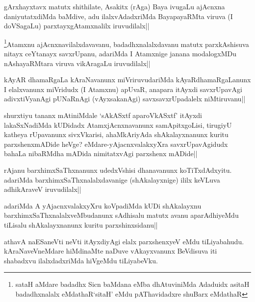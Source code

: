 
\begin{artha}
gArxhayxtavx matutx shithilate, Asakitx (rAga) Baya ivugaLu ajAcnxna daniyutatxdiMda baMdive, adu ilalxvAdadxriMda BayapayaRMta viruva (I doVSagaLu) parxtayxgAtamxnalilx iruvudilalx||
\end{artha}

\begin{artha}
\footnote[1]{sataH aMdare badadhx Sicn baMdana eMba dhAtuviniMda Adaduidx asitaH badadhxnalalx eMdathaR`sitaH' eMdu pAThavidadxre shuBarx eMdathaR}Atamxnu ajAcnxnavilalxdavavanu, badadhxnalalxdavanu matutx parxkAshisuva nitayx ceYtanayx savxrUpanu, adariMda I Atamxnige janana modalogxMDu nAshayaRMtara viruva vikAragaLu iruvudilalx||
\end{artha}

\begin{artha}
kAyAR dhamaRgaLa kAraNavanunx miVriruvudariMda kAyaRdhamaRgaLanunx I elalxvanunx miVridudx (I Atamxnu) apUvaR, anapara itAyxdi savxrUpavAgi adivxtiVyanAgi pUNaRnAgi (vAyxsakanAgi) savxsavxrUpadalelx niMtiruvanu||
\end{artha}

\stext 

\begin{artha}%
shurxtiyu tananx mAtiniMdale `sAkASxtf aparoVkASxtf' itAyxdi lakaSxNadiMda kUDidadx AtamxjAcnxnavanunx samApitxgoLisi, tirugiyU katheya rUpavanunx sivxVkarisi, ahaMkAriyAda shAkalayxnanunx kuritu parxshenxmADide heVge? eMdare-yAjacnxvalakxyXra savxrUpavAgidudx bahaLa nibaRMdha mADida nimitatxvAgi parxshenx mADide||
\end{artha}


\begin{artha}
rAjanu barxhimxSaThxnanunx udedxVshisi dhanavanunx koTiTxdAdxyitu. adariMda barxhimxSaThxnalalxdavanige (shAkalayxnige) ililx keVLuva adhikAraveV iruvudilalx||
\end{artha}

\begin{artha}
adariMda A yAjacnxvalakxyXru koVpadiMda kUDi shAkalayxnu barxhimxSaThxnalalxveMbudanunx sAdhisalu matutx avanu aparAdhiyeMdu tiLisalu shAkalayxnanunx kuritu parxshinxsidanu||
\end{artha}

\begin{artha}%
athavA naESaneVti neVti itAyxdiyAgi elalx parxshenxyeV eMdu tiLiyabahudu. kAraNaveVneMdare hiMdinaMte naDuve vAkayxvanunx BeVdisuva iti shabadxvu ilalxdadxriMda hiVgeMdu tiLiyabeVku.
\end{artha}

